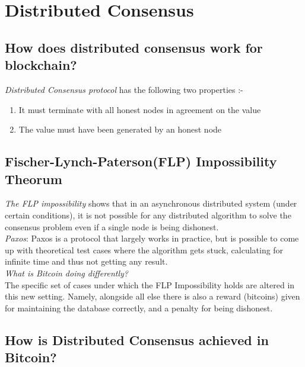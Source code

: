 \documentclass[10pt,a4paper]{article}
\begin{document}
\section{Distributed Consensus}

\subsection{How does distributed consensus work for blockchain?}

\emph{Distributed Consensus protocol} has the following two properties :- 
\begin{enumerate}
\item It must terminate with all honest nodes in agreement on the value

\item The value must have been generated by an honest node
\end{enumerate}

\subsection{Fischer-Lynch-Paterson(FLP) Impossibility Theorum}

\emph{The FLP impossibility} shows that in an asynchronous distributed system (under certain conditions), it is not possible for any distributed algorithm to solve the consensus problem even if a single node is being dishonest.\\

\emph{Paxos}: Paxos is a protocol that largely works in practice, but is possible to come up with theoretical test cases where the algorithm gets stuck, calculating for infinite time and thus not getting any result.\\

\emph{What is Bitcoin doing differently?}\\
The specific set of cases under which the FLP Impossibility holds are altered in this new setting. Namely, alongside all else there is also a reward (bitcoins) given for maintaining the database correctly, and a penalty for being dishonest.

\subsection{How is Distributed Consensus achieved in Bitcoin?}
\end{document}
